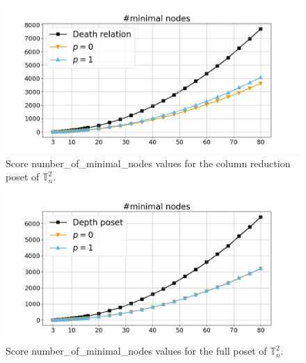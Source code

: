 \documentclass{article}
\begin{document}
    \begin{figure}[h!]
        \centering
        \hspace*{-0.24\textwidth}
        \includegraphics[width=1.4\textwidth]{pics/extended torus scores/score=number-of-minimal-nodes, dim=2, object=column reduction.png}
        \caption{Score number\_of\_minimal\_nodes values for the column reduction poset of $\mathbb{T}_n^{2}$.}
        \label{fig:numberofminimalnodes-columnreduction2}
    \end{figure}
    \begin{figure}[h!]
        \centering
        \hspace*{-0.24\textwidth}
        \includegraphics[width=1.4\textwidth]{pics/extended torus scores/score=number-of-minimal-nodes, dim=2, object=full.png}
        \caption{Score number\_of\_minimal\_nodes values for the full poset of $\mathbb{T}_n^{2}$.}
        \label{fig:numberofminimalnodes-full2}
    \end{figure}
\end{document}
